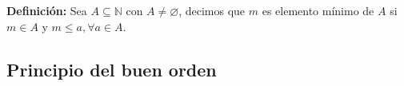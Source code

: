 \documentclass[11pt]{article}
\newcommand{\N}{\mathbb{N}}
\newcommand{\R}{\mathbb{R}}
\let\emptyset\varnothing
\begin{document}
\begin{enumerate}[label=\alph*)]
\begin{enumerate}[label=\roman*)]
    \end{enumerate}

\end{enumerate}

\pagebreak

\textbf{Definición:} Sea $A\subseteq \N$ con $A \neq \emptyset$, decimos que $m$ es elemento mínimo de $A$ si $m\in A$ y $m\leq a, \forall a\in A$.

\subsection*{Principio del buen orden}
\end{document}
